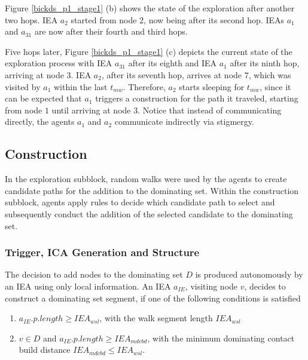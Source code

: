 Figure \ref{bickds_p1_stage1} (b) shows the state of the exploration after another two hops. IEA $a_2$ started from node $2$, now being after its second hop. IEAs $a_1$ and $a_{31}$ are now after their fourth and third hops. 

Five hops later, Figure \ref{bickds_p1_stage1} (c) depicts the current state of the exploration process with IEA $a_{31}$ after its eighth and IEA $a_1$ after its ninth hop, arriving at node $3$. IEA $a_2$, after its seventh hop, arrives at node $7$, which was visited by $a_1$ within the last $t_{mw}$. Therefore, $a_2$ starts sleeping for $t_{mw}$, since it can be expected that $a_1$ triggers a construction for the path it traveled, starting from node $1$ until arriving at node $3$. Notice that instead of communicating directly, the agents $a_1$ and $a_2$ communicate indirectly via stigmergy.


\exampleEnd


\subsection{Construction}\label{p1con}


In the exploration subblock, random walks were used by the agents to create candidate paths for the addition to the dominating set. Within the construction subblock, agents apply rules to decide which candidate path to select and subsequently conduct the addition of the selected candidate to the dominating set.

\subsubsection{Trigger, ICA Generation and Structure}\label{sec_taig} The decision to add nodes to the dominating set $D$ is produced autonomously by an IEA using only local information. An IEA $a_{IE}$, visiting node $v$, decides to construct a dominating set segment, if one of the following conditions is satisfied

\begin{enumerate}

\item $a_{IE}.p.length \geq IEA_{wsl}$, with the walk segment length $IEA_{wsl}$

\label{introieawsl}

\item $v\in D$ and $a_{IE}.p.length \geq IEA_{mdcbd}$, with the minimum dominating contact build distance $IEA_{mdcbd} \leq IEA_{wsl}$. 

\end{enumerate}


